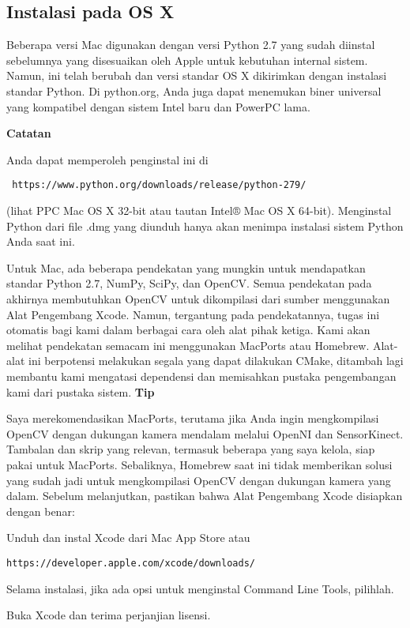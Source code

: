 \subsection{Instalasi pada OS X}

Beberapa versi Mac digunakan dengan versi Python 2.7 yang sudah diinstal sebelumnya yang disesuaikan oleh Apple untuk kebutuhan internal sistem. Namun, ini telah berubah dan versi standar OS X dikirimkan dengan instalasi standar Python. Di python.org, Anda juga dapat menemukan biner universal yang kompatibel dengan sistem Intel baru dan PowerPC lama.

\textbf{Catatan}

Anda dapat memperoleh penginstal ini di \begin{verbatim} https://www.python.org/downloads/release/python-279/ \end{verbatim} (lihat PPC Mac OS X 32-bit atau tautan Intel® Mac OS X 64-bit). Menginstal Python dari file .dmg yang diunduh hanya akan menimpa instalasi sistem Python Anda saat ini.

Untuk Mac, ada beberapa pendekatan yang mungkin untuk mendapatkan standar Python 2.7, NumPy, SciPy, dan OpenCV. Semua pendekatan pada akhirnya membutuhkan OpenCV untuk dikompilasi dari sumber menggunakan Alat Pengembang Xcode. Namun, tergantung pada pendekatannya, tugas ini otomatis bagi kami dalam berbagai cara oleh alat pihak ketiga. Kami akan melihat pendekatan semacam ini menggunakan MacPorts atau Homebrew. Alat-alat ini berpotensi melakukan segala yang dapat dilakukan CMake, ditambah lagi membantu kami mengatasi dependensi dan memisahkan pustaka pengembangan kami dari pustaka sistem.
\newpage
\textbf{Tip}

Saya merekomendasikan MacPorts, terutama jika Anda ingin mengkompilasi OpenCV dengan dukungan kamera mendalam melalui OpenNI dan SensorKinect. Tambalan dan skrip yang relevan, termasuk beberapa yang saya kelola, siap pakai untuk MacPorts. Sebaliknya, Homebrew saat ini tidak memberikan solusi yang sudah jadi untuk mengkompilasi OpenCV dengan dukungan kamera yang dalam. Sebelum melanjutkan, pastikan bahwa Alat Pengembang Xcode disiapkan dengan benar:

Unduh dan instal Xcode dari Mac App Store atau \begin{verbatim}https://developer.apple.com/xcode/downloads/ \end{verbatim} Selama instalasi, jika ada opsi untuk menginstal Command Line Tools, pilihlah.

Buka Xcode dan terima perjanjian lisensi.

